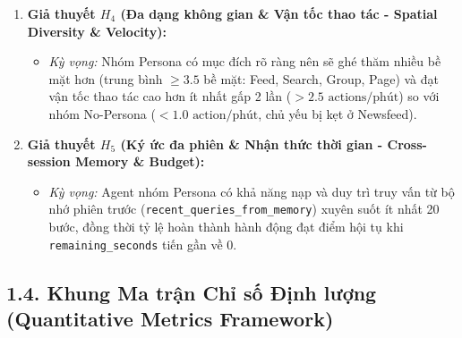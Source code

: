 \documentclass[11pt]{article}
\providecommand{\tightlist}{%
      \setlength{\itemsep}{0pt}\setlength{\parskip}{0pt}}
\begin{document}
\begin{enumerate}
  \begin{itemize}
  \tightlist
  \item
    \emph{Kỳ vọng:} Nhóm Persona có \texttt{situational\_steps\ =\ 0} và
    hoàn toàn không phát sinh cảnh báo tiết chế trong suốt phiên chạy.
    Nhóm No-Persona sẽ xuất hiện hiện tượng trôi dạt nhận thức (sa đà
    vào chủ đề tình huống \(\ge 5\) bước liên tiếp) và kích hoạt ít nhất
    10 lần dòng thông điệp \texttt{CẢNH\ BÁO\ TIẾT\ CHẾ}.
  \end{itemize}
\item
  \textbf{Giả thuyết \(H_4\) (Đa dạng không gian \& Vận tốc thao tác -
  Spatial Diversity \& Velocity):}

  \begin{itemize}
  \tightlist
  \item
    \emph{Kỳ vọng:} Nhóm Persona có mục đích rõ ràng nên sẽ ghé thăm
    nhiều bề mặt hơn (trung bình \(\ge 3.5\) bề mặt: Feed, Search,
    Group, Page) và đạt vận tốc thao tác cao hơn ít nhất gấp 2 lần
    (\(> 2.5\text{ actions/phút}\)) so với nhóm No-Persona
    (\(< 1.0\text{ action/phút}\), chủ yếu bị kẹt ở Newsfeed).
  \end{itemize}
\item
  \textbf{Giả thuyết \(H_5\) (Ký ức đa phiên \& Nhận thức thời gian -
  Cross-session Memory \& Budget):}

  \begin{itemize}
  \tightlist
  \item
    \emph{Kỳ vọng:} Agent nhóm Persona có khả năng nạp và duy trì truy
    vấn từ bộ nhớ phiên trước (\texttt{recent\_queries\_from\_memory})
    xuyên suốt ít nhất 20 bước, đồng thời tỷ lệ hoàn thành hành động đạt
    điểm hội tụ khi \texttt{remaining\_seconds} tiến gần về 0.
  \end{itemize}
\end{enumerate}

    \subsection{1.4. Khung Ma trận Chỉ số Định lượng (Quantitative Metrics
Framework)}\label{khung-ma-trux1eadn-chux1ec9-sux1ed1-ux111ux1ecbnh-lux1b0ux1ee3ng-quantitative-metrics-framework}
\end{document}
